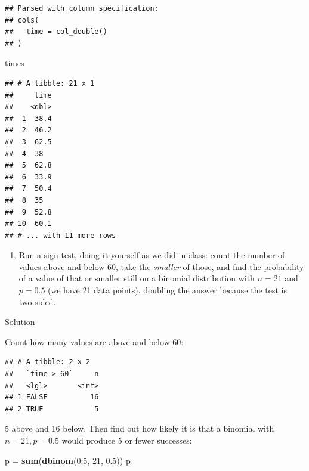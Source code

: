 \documentclass[]{tufte-book}
\newenvironment{Shaded}{}{}
\newcommand{\DecValTok}[1]{\textcolor[rgb]{0.25,0.63,0.44}{#1}}
\newcommand{\FloatTok}[1]{\textcolor[rgb]{0.25,0.63,0.44}{#1}}
\newcommand{\KeywordTok}[1]{\textcolor[rgb]{0.00,0.44,0.13}{\textbf{#1}}}
\newcommand{\NormalTok}[1]{#1}
\newcommand{\OperatorTok}[1]{\textcolor[rgb]{0.40,0.40,0.40}{#1}}
\newcommand{\StringTok}[1]{\textcolor[rgb]{0.25,0.44,0.63}{#1}}
\providecommand{\tightlist}{%
  \setlength{\itemsep}{0pt}\setlength{\parskip}{0pt}}
\theoremstyle{definition}
\theoremstyle{definition}
\theoremstyle{definition}
\theoremstyle{remark}
\begin{document}
\begin{verbatim}
## Parsed with column specification:
## cols(
##   time = col_double()
## )
\end{verbatim}

\begin{Shaded}
\begin{Highlighting}[]
\NormalTok{times}
\end{Highlighting}
\end{Shaded}

\begin{verbatim}
## # A tibble: 21 x 1
##     time
##    <dbl>
##  1  38.4
##  2  46.2
##  3  62.5
##  4  38  
##  5  62.8
##  6  33.9
##  7  50.4
##  8  35  
##  9  52.8
## 10  60.1
## # ... with 11 more rows
\end{verbatim}

\begin{enumerate}
\def\labelenumi{(\alph{enumi})}
\setcounter{enumi}{1}
\tightlist
\item
  Run a sign test, doing it yourself as we did in class: count the
  number of values above and below 60, take the \emph{smaller} of those,
  and find the probability of a value of that or smaller still on a
  binomial distribution with \(n=21\) and \(p=0.5\) (we have 21 data
  points), doubling the answer because the test is two-sided.
\end{enumerate}

Solution

Count how many values are above and below 60:

\begin{Shaded}
\end{Shaded}

\begin{verbatim}
## # A tibble: 2 x 2
##   `time > 60`     n
##   <lgl>       <int>
## 1 FALSE          16
## 2 TRUE            5
\end{verbatim}

5 above and 16 below. Then find out how likely it is that a binomial
with \(n=21, p=0.5\) would produce 5 or fewer successes:

\begin{Shaded}
\begin{Highlighting}[]
\NormalTok{p =}\StringTok{ }\KeywordTok{sum}\NormalTok{(}\KeywordTok{dbinom}\NormalTok{(}\DecValTok{0}\OperatorTok{:}\DecValTok{5}\NormalTok{, }\DecValTok{21}\NormalTok{, }\FloatTok{0.5}\NormalTok{))}
\NormalTok{p}
\end{Highlighting}
\end{Shaded}
\end{document}
